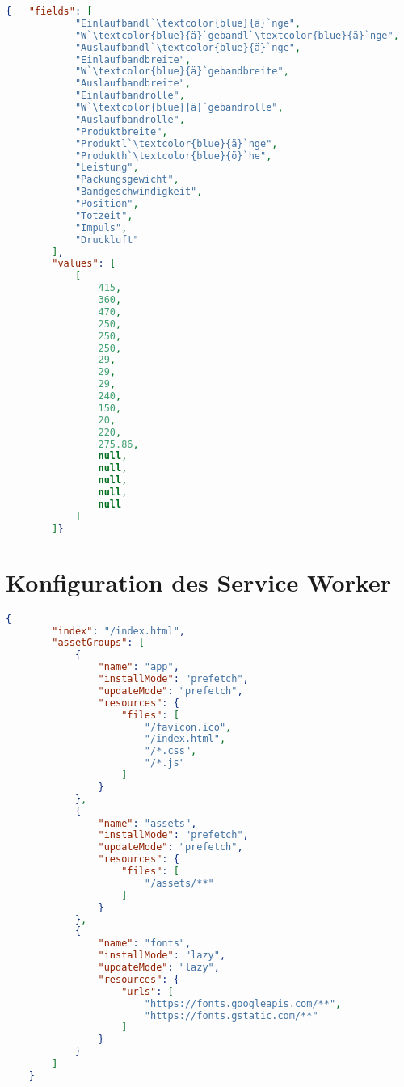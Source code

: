 \begin{lstlisting}[language=JSON, caption=Testparameter für Postman, label=ls:anhang_postman, escapeinside=``]
    {   "fields": [
            "Einlaufbandl`\textcolor{blue}{ä}`nge",
            "W`\textcolor{blue}{ä}`gebandl`\textcolor{blue}{ä}`nge",
            "Auslaufbandl`\textcolor{blue}{ä}`nge",
            "Einlaufbandbreite",
            "W`\textcolor{blue}{ä}`gebandbreite",
            "Auslaufbandbreite",
            "Einlaufbandrolle",
            "W`\textcolor{blue}{ä}`gebandrolle",
            "Auslaufbandrolle",
            "Produktbreite",
            "Produktl`\textcolor{blue}{ä}`nge",
            "Produkth`\textcolor{blue}{ö}`he",
            "Leistung",
            "Packungsgewicht",
            "Bandgeschwindigkeit",
            "Position",
            "Totzeit",
            "Impuls",
            "Druckluft"
        ],
        "values": [
            [
                415,
                360,
                470,
                250,
                250,
                250,
                29,
                29,
                29,
                240,
                150,
                20,
                220,
                275.86,
                null,
                null,
                null,
                null,
                null
            ]
        ]}
\end{lstlisting}

\newpage

\section{Konfiguration des Service Worker}
\label{sec:serviceWorkerConfig}

\begin{lstlisting}[language=JSON, caption=Konfiguration des Service Workers, label=ls:anhang_serviceworker]
    {
        "index": "/index.html",
        "assetGroups": [
            {
                "name": "app",
                "installMode": "prefetch",
                "updateMode": "prefetch",
                "resources": {
                    "files": [
                        "/favicon.ico",
                        "/index.html",
                        "/*.css",
                        "/*.js"
                    ]
                }
            },
            {
                "name": "assets",
                "installMode": "prefetch",
                "updateMode": "prefetch",
                "resources": {
                    "files": [
                        "/assets/**"
                    ]
                }
            },
            {
                "name": "fonts",
                "installMode": "lazy",
                "updateMode": "lazy",
                "resources": {
                    "urls": [
                        "https://fonts.googleapis.com/**",
                        "https://fonts.gstatic.com/**"
                    ]
                }
            }
        ]
    }
\end{lstlisting}